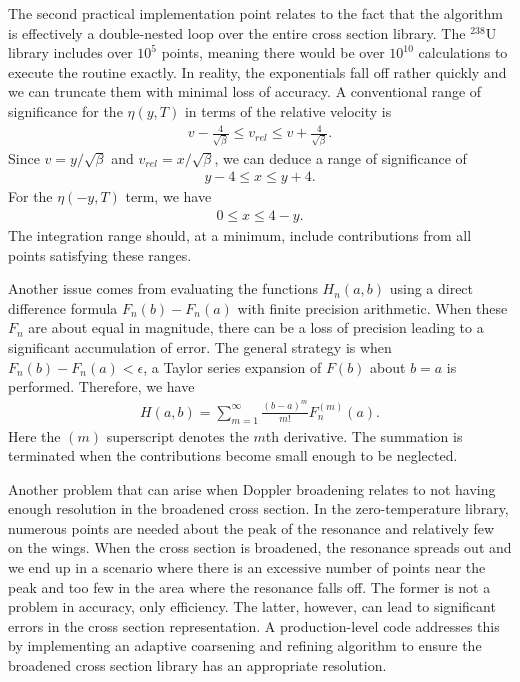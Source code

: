 The second practical implementation point relates to the fact that the algorithm is effectively a double-nested loop over the entire cross section library. The $^{238}$U library includes over $10^5$ points, meaning there would be over $10^{10}$ calculations to execute the routine exactly. In reality, the exponentials fall off rather quickly and we can truncate them with minimal loss of accuracy. A conventional range of significance for the $\eta(y,T)$ in terms of the relative velocity is 
\begin{align}
  v - \frac{4}{\sqrt{\beta}} \le v_{rel} \le v + \frac{4}{\sqrt{\beta}} . \nonumber
\end{align}
Since $v = y/\sqrt{\beta}$ and $v_{rel} = x/\sqrt{\beta}$, we can deduce a range of significance of
\begin{align}
  y - 4 \le x \le y + 4. \nonumber
\end{align}
For the $\eta(-y,T)$ term, we have
\begin{align}
  0 \le x \le 4 - y. \nonumber
\end{align}
The integration range should, at a minimum, include contributions from all points satisfying these ranges.

Another issue comes from evaluating the functions $H_n(a,b)$ using a direct difference formula $F_n(b) - F_n(a)$ with finite precision arithmetic. When these $F_n$ are about equal in magnitude, there can be a loss of precision leading to a significant accumulation of error. The general strategy is when $F_n(b) - F_n(a) < \epsilon$, a Taylor series expansion of $F(b)$ about $b = a$ is performed. Therefore, we have
\begin{align}
  H(a,b) = \sum_{m=1}^\infty \frac{(b-a)^m}{m!} F_n^{(m)}(a) .
\end{align}
Here the $(m)$ superscript denotes the $m$th derivative. The summation is terminated when the contributions become small enough to be neglected.

Another problem that can arise when Doppler broadening relates to not having enough resolution in the broadened cross section. In the zero-temperature library, numerous points are needed about the peak of the resonance and relatively few on the wings. When the cross section is broadened, the resonance spreads out and we end up in a scenario where there is an excessive number of points near the peak and too few in the area where the resonance falls off. The former is not a problem in accuracy, only efficiency. The latter, however, can lead to significant errors in the cross section representation. A production-level code addresses this by implementing an adaptive coarsening and refining algorithm to ensure the broadened cross section library has an appropriate resolution.





